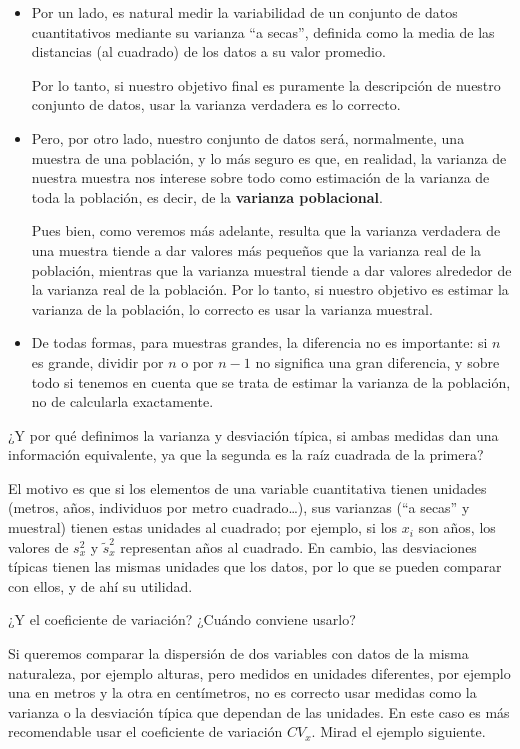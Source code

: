 \documentclass[
]{book}
\theoremstyle{definition}
\theoremstyle{definition}
\theoremstyle{definition}
\theoremstyle{definition}
\theoremstyle{remark}
\begin{document}
\begin{itemize}
\item
  Por un lado, es natural medir la variabilidad de un conjunto de datos cuantitativos mediante su varianza ``a secas'', definida como la media de las distancias (al cuadrado) de los datos a su valor promedio.

  Por lo tanto, si nuestro objetivo final es puramente la descripción de nuestro conjunto de datos, usar la varianza verdadera es lo correcto.
\item
  Pero, por otro lado, nuestro conjunto de datos será, normalmente, una muestra de una población, y lo más seguro es que, en realidad, la varianza de nuestra muestra nos interese sobre todo como estimación de la varianza de toda la población, es decir, de la \textbf{varianza poblacional}.

  Pues bien, como veremos más adelante, resulta que la varianza verdadera de una muestra tiende a dar valores más pequeños que la varianza real de la población, mientras que la varianza muestral tiende a dar valores alrededor de la varianza real de la población. Por lo tanto, si nuestro objetivo es estimar la varianza de la población, lo correcto es usar la varianza muestral.
\item
  De todas formas, para muestras grandes, la diferencia no es importante: si \(n\) es grande, dividir por \(n\) o por \(n-1\) no significa una gran diferencia, y sobre todo si tenemos en cuenta que se trata de estimar la varianza de la población, no de calcularla exactamente.
\end{itemize}

\begin{rmdromans}
¿Y por qué definimos la varianza y desviación típica, si ambas medidas dan una información equivalente, ya que la segunda es la raíz cuadrada de la primera?

El motivo es que si los elementos de una variable cuantitativa tienen unidades (metros, años, individuos por metro cuadrado\ldots), sus varianzas (``a secas'' y muestral) tienen estas unidades al cuadrado; por ejemplo, si los \(x_i\) son años, los valores de \(s_x^2\) y \(\tilde{s}_x^2\) representan años al cuadrado. En cambio, las desviaciones típicas tienen las mismas unidades que los datos, por lo que se pueden comparar con ellos, y de ahí su utilidad.
\end{rmdromans}

\begin{rmdnote}
¿Y el coeficiente de variación? ¿Cuándo conviene usarlo?

Si queremos comparar la dispersión de dos variables con datos de la misma naturaleza, por ejemplo alturas, pero medidos en unidades diferentes, por ejemplo una en metros y la otra en centímetros, no es correcto usar medidas como la varianza o la desviación típica que dependan de las unidades. En este caso es más recomendable usar el coeficiente de variación \(CV_x\). Mirad el ejemplo siguiente.
\end{rmdnote}
\end{document}
